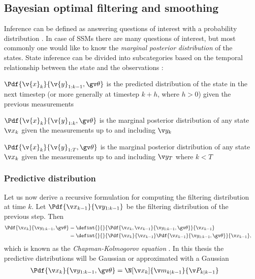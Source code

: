 \subsection{Bayesian optimal filtering and smoothing}

Inference can be defined as answering questions of interest with a probability distribution \parencite{barber2011bayesian}.
In case of SSMs there are many questions of interest, but most commonly one would
like to know the \emph{marginal posterior distribution} of the states. State inference
can be divided into subcategories based on the temporal relationship between the state
and the observations \parencite{Sarkka2006}:
\begin{description}
\addtolength{\leftskip}{1cm}
	\item[Predictive distribution]
	$\Pdf{\v{x}_{k}}{\v{y}_{1:k-1},\Th}$ is the predicted distribution of the state in the next timestep (or more generally at timestep $k+h$, where $h>0$) 
	given the previous measurements
	\item[Filtering distribution] $\Pdf{\v{x}_k}{\v{y}_{1:k},\Th}$ is the marginal posterior distribution
	of any state $\xk$ given the measurements up to and including $\yk$
	\item[Smoothing distribution]
	$\Pdf{\v{x}_k}{\v{y}_{1:T},\Th}$ is the marginal posterior distribution
	of any state $\xk$ given the measurements up to and including $\y_T$ where $k<T$
\end{description} 


\subsubsection*{Predictive distribution}
Let us now derive a recursive formulation for computing the filtering distribution at time $k$. Let $\Pdf{\xkk}{\y_{1:k-1}}$
be the filtering distribution of the previous step. Then 
\begin{align}
	\Pdf{\xk}{\y_{1:k-1},\Th}&=\defint{}{}{\Pdf{\xk,\xkk}{\y_{1:k-1},\Th}}{\xkk} \nonumber\\
	&=\defint{}{}{\Pdf{\xk}{\xkk}\Pdf{\xkk}{\y_{1:k-1},\Th}}{\xkk},
	\label{eq:pred_bayes}
\end{align}
which is known as the \emph{Chapman-Kolmogorov equation} \parencite{Sarkka2006}.
In this thesis the predictive distributions will be Gaussian or approximated with a Gaussian
\begin{align}
	\Pdf{\xk}{\y_{1:k-1},\Th}&=\N[\xk]{\m_{k|k-1}}{\P_{k|k-1}}
\end{align}

